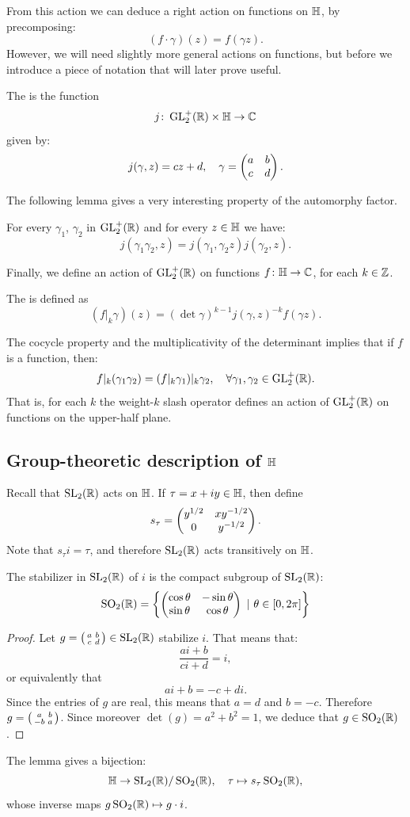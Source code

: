 From this action we can deduce a right action on functions on $\mathbb{H}$, by precomposing:
\[
(f\cdot \gamma)(z) = f(\gamma z).
\]
However, we will need slightly more general actions on functions, but before we introduce a piece of notation that will later prove  useful.

\begin{definition}
  The  is the function
\[
j\colon \operatorname{GL}_2^+(\mathbb{R})\times \mathbb{H} \to \mathbb{C}
\]
given by:
\[
j(\gamma,z) = cz+d,\quad \gamma = \left(\begin{matrix}a&b\\c&d\end{matrix}\right).
\]
\end{definition}
The following lemma gives a very interesting property of the automorphy factor.
\begin{lemma}
For every $\gamma_1$, $\gamma_2$ in $\operatorname{GL}_2^+(\mathbb{R})$ and for every $z\in\mathbb{H}$ we have:
\[
j(\gamma_1\gamma_2,z) = j(\gamma_1,\gamma_2z)j(\gamma_2,z).
\]
\end{lemma}
Finally, we define an action of $\operatorname{GL}_2^+(\mathbb{R})$ on functions $f\colon\mathbb{H}\to\mathbb{C}$, for each $k\in\mathbb{Z}$.
\begin{definition}
  The  is defined as
\begin{equation}
(f|_k\gamma)(z) = (\det \gamma)^{k-1} j(\gamma,z)^{-k}f(\gamma z).
\end{equation}
\end{definition}

The cocycle property and the multiplicativity of the determinant implies that if $f$ is a function, then:
\[
f|_k(\gamma_1\gamma_2) = (f|_k\gamma_1)|_k\gamma_2, \quad \forall \gamma_1,\gamma_2\in\operatorname{GL}_2^+(\mathbb{R}).
\]
That is, for each $k$ the weight-$k$ slash operator defines an action of $\operatorname{GL}_2^+(\mathbb{R})$ on functions on the upper-half plane.

\subsection{Group-theoretic description of \texorpdfstring{$\mathbb{H}$}{HH}}
Recall that $\operatorname{SL}_2(\mathbb{R})$ acts on $\mathbb{H}$. If $\tau=x+iy\in\mathbb{H}$, then define
\[
s_\tau =\left(\begin{matrix}y^{1/2}&xy^{-1/2}\\0&y^{-1/2}\end{matrix}\right).
\]
Note that $s_\tau i = \tau$, and therefore $\operatorname{SL}_2(\mathbb{R})$ acts transitively on $\mathbb{H}$.
\begin{lemma}
  The stabilizer in $\operatorname{SL}_2(\mathbb{R})$ of $i$ is the compact subgroup of $\operatorname{SL}_2(\mathbb{R})$:
\[
\operatorname{SO}_2(\mathbb{R})=\left\{\left(\begin{matrix}\cos\theta&-\sin\theta\\\sin\theta&\cos\theta\end{matrix}\right) ~|~ \theta\in [0,2\pi]\right\}
\]
\end{lemma}
\begin{proof}
Let $g=\left(\begin{smallmatrix}a&b\\c&d\end{smallmatrix}\right) \in\operatorname{SL}_2(\mathbb{R})$ stabilize $i$. That means that:
\[
\frac{ai + b}{ci +d} = i,
\]
or equivalently that
\[
ai+b = -c+di.
\]
Since the entries of $g$ are real, this means that $a=d$ and $b=-c$. Therefore $g=\left(\begin{smallmatrix}a&b\\-b&a\end{smallmatrix}\right)$. Since moreover $\det(g)=a^2+b^2=1$, we deduce that $g\in \operatorname{SO}_2(\mathbb{R})$.
\end{proof}
The lemma gives a bijection:
\[
\mathbb{H}\to \operatorname{SL}_2(\mathbb{R})/\operatorname{SO}_2(\mathbb{R}),\quad \tau\mapsto s_\tau\operatorname{SO}_2(\mathbb{R}),
\]
whose inverse maps $g\operatorname{SO}_2(\mathbb{R})\mapsto g\cdot i$.

